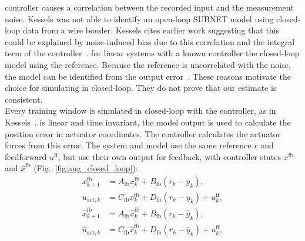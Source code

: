  controller causes a correlation between
the recorded input and the measurement noise.
Kessels was not able to identify an open-loop SUBNET model
using closed-loop data from a wire bonder.
Kessels cites earlier work suggesting that this could be explained by noise-induced bias
due to this correlation and the integral term 
of the controller~\cite[Remark~5.6]{kessels2025ai}.
 for linear systems with a known controller the closed-loop model using the reference.
Because the reference is uncorrelated with the noise, the model 
can be identified from the output error~\cite[Sec.~5.2.1]{forssell1999revisited}.
These reasons motivate the choice for simulating in closed-loop.
They do not prove that our estimate is consistent. 
\\
Every training window is simulated in closed-loop with the  controller,
as in Kessels~\cite[Eqs.~(5.12), (5.13)]{kessels2025ai}.
 is linear and time invariant, the model output is used to
calculate the position error in actuator coordinates.
The controller calculates the actuator forces from this error.
The system and model use the same reference $r$ and feedforward
$u^{\mathrm{ff}}$, but use their own output for feedback, with controller
states $x^{\mathrm{fb}}$ and $\hat x^{\mathrm{fb}}$
(Fig.~\ref{fig:aug_closed_loop}):
\begin{equation}
\begin{aligned}
 x^{\mathrm{fb}}_{k+1}&=A_{\mathrm{fb}}x^{\mathrm{fb}}_k+B_{\mathrm{fb}}(r_k-y_k),\\
 u_{\mathrm{act},k}&=C_{\mathrm{fb}}x^{\mathrm{fb}}_k+D_{\mathrm{fb}}(r_k-y_k)+u^{\mathrm{ff}}_k,\\
 \hat x^{\mathrm{fb}}_{k+1}&=A_{\mathrm{fb}}\hat x^{\mathrm{fb}}_k+B_{\mathrm{fb}}(r_k-\hat y_k),\\
 \hat u_{\mathrm{act},k}&=C_{\mathrm{fb}}\hat x^{\mathrm{fb}}_k+D_{\mathrm{fb}}(r_k-\hat y_k)+u^{\mathrm{ff}}_k,
\end{aligned}
\label{eq:aug_two_loops}
\end{equation}
